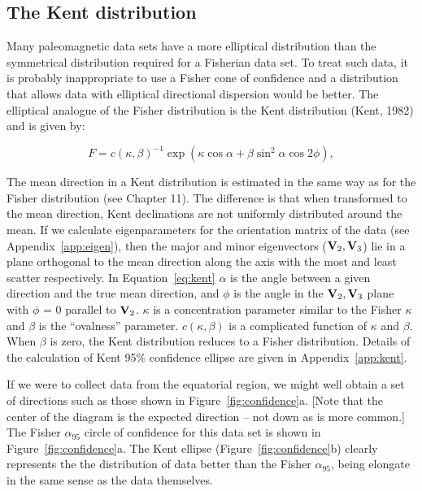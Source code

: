 \subsection{The Kent distribution}

Many paleomagnetic data sets  have a  more elliptical distribution than the symmetrical distribution required for a Fisherian data set.   To treat such data, it is probably inappropriate to use a Fisher cone of confidence and a distribution that allows data with elliptical directional dispersion would be better. The elliptical analogue of the Fisher distribution is the 
Kent distribution (Kent, 1982) \nocite{kent82} and  is given by:
    
\begin{equation}
   F = c(\kappa,\beta)^{-1} \exp(\kappa \cos \alpha + \beta \sin^2 \alpha \cos 2\phi),
\label{eq:kent}
\end{equation}

   \noindent  The mean direction   in a Kent distribution is estimated in the same way as for the Fisher distribution (see Chapter 11).  The difference is that when transformed to the mean direction, Kent declinations are not uniformly distributed around the mean.   If we calculate eigenparameters for  the orientation matrix of the data (see Appendix~\ref{app:eigen}), then the major and minor eigenvectors ($\hbox{\bf V}_2, \hbox{\bf V}_3$) lie in  a plane orthogonal to the mean direction along the axis with the most and least scatter respectively.  In Equation~\ref{eq:kent}  $\alpha$ is the angle between a given direction and the true mean direction, and $\phi$ is the angle in the  $\hbox{\bf V}_2, \hbox{\bf V}_3$ plane  with $\phi$ = 0 parallel to  $\hbox{\bf V}_2$.  $\kappa$ is a concentration parameter similar to the Fisher $\kappa$ and $\beta$ is the ``ovalness'' parameter.  $c(\kappa,\beta)$ is a complicated function of $\kappa$ and $\beta$.  When $\beta $ is zero, the 
   Kent distribution reduces to a Fisher
distribution.    Details of the calculation of 
Kent 95\% confidence ellipse are given in Appendix~\ref{app:kent}.    

If we were to collect data from the equatorial region, we might well obtain a set of directions such as those shown in Figure~\ref{fig:confidence}a. [Note that the center of the diagram is the expected direction -- not down as is more common.]    The Fisher $\alpha_{95}$ circle of confidence for this data set is shown in Figure~\ref{fig:confidence}a.    The Kent ellipse (Figure~\ref{fig:confidence}b) clearly represents the the distribution of data better than the Fisher $\alpha_{95}$, being elongate in the same sense as the data themselves.    

